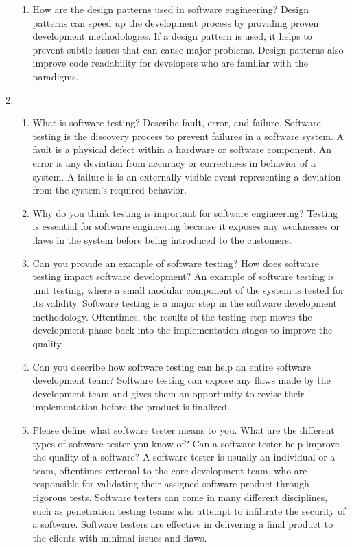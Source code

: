 \documentclass[12pt]{article}
\begin{document}
\begin{enumerate}
\begin{enumerate}[start=1,align=left]
      \item How are the design patterns used in software engineering?
      Design patterns can speed up the development process by providing proven development methodologies. If a design pattern is used, it helps to prevent subtle issues that can cause major problems. Design patterns also improve code readability for developers who are familiar with the paradigms.

    \end{enumerate}

    \item
    \begin{enumerate}[start=1,align=left]
      \item What is software testing? Describe fault, error, and failure.
      Software testing is the discovery process to prevent failures in a software system. A fault is a physical defect within a hardware or software component. An error is any deviation from accuracy or correctness in behavior of a system. A failure is is an externally visible event representing a deviation from the system’s required behavior.

      \item Why do you think testing is important for software engineering? 
      Testing is essential for software engineering because it exposes any weaknesses or flaws in the system before being introduced to the customers.

      \item Can you provide an example of software testing? How does software testing impact software development? 
      An example of software testing is unit testing, where a small modular component of the system is tested for its validity. Software testing is a major step in the software development methodology. Oftentimes, the results of the testing step moves the development phase back into the implementation stages to improve the quality.

      \item Can you describe how software testing can help an entire software development team?
      Software testing can expose any flaws made by the development team and gives them an opportunity to revise their implementation before the product is finalized.

      \item Please define what software tester means to you. What are the different types of software tester you know of? Can a software tester help improve the quality of a software?
      A software tester is usually an individual or a team, oftentimes external to the core development team, who are responsible for validating their assigned software product through rigorous tests. Software testers can come in many different disciplines, such as penetration testing teams who attempt to infiltrate the security of a software. Software testers are effective in delivering a final product to the clients with minimal issues and flaws.


\end{enumerate}
\end{enumerate}
\end{document}
